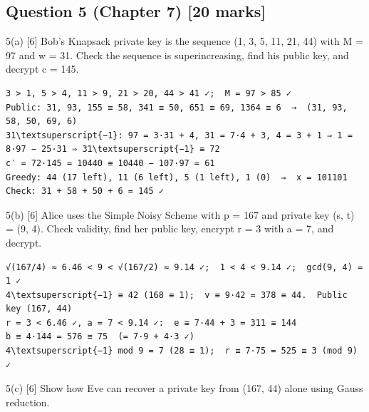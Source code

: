 \documentclass[11pt,a4paper]{article}
\begin{document}
\subsection*{Question 5 (Chapter 7) [20 marks]}
\begin{question}{5(a) \hfill\textnormal{\small [6]}}
Bob's Knapsack private key is the sequence (1, 3, 5, 11, 21, 44) with M = 97 and w = 31. Check the sequence is superincreasing, find his public key, and decrypt c = 145.\par
\end{question}
\begin{answer}
\begin{workbox}
\begin{Verbatim}[commandchars=\\\{\},fontsize=\footnotesize]
3 > 1, 5 > 4, 11 > 9, 21 > 20, 44 > 41 ✓;  M = 97 > 85 ✓
Public: 31, 93, 155 ≡ 58, 341 ≡ 50, 651 ≡ 69, 1364 ≡ 6  →  (31, 93, 58, 50, 69, 6)
31\textsuperscript{−1}: 97 = 3·31 + 4, 31 = 7·4 + 3, 4 = 3 + 1 ⇒ 1 = 8·97 − 25·31 ⇒ 31\textsuperscript{−1} ≡ 72
c′ = 72·145 = 10440 ≡ 10440 − 107·97 = 61
Greedy: 44 (17 left), 11 (6 left), 5 (1 left), 1 (0)  ⇒  x = 101101
Check: 31 + 58 + 50 + 6 = 145 ✓
\end{Verbatim}
\end{workbox}
\end{answer}
\begin{question}{5(b) \hfill\textnormal{\small [6]}}
Alice uses the Simple Noisy Scheme with p = 167 and private key (s, t) = (9, 4). Check validity, find her public key, encrypt r = 3 with a = 7, and decrypt.\par
\end{question}
\begin{answer}
\begin{workbox}
\begin{Verbatim}[commandchars=\\\{\},fontsize=\footnotesize]
√(167/4) ≈ 6.46 < 9 < √(167/2) ≈ 9.14 ✓;  1 < 4 < 9.14 ✓;  gcd(9, 4) = 1 ✓
4\textsuperscript{−1} ≡ 42 (168 ≡ 1);  v ≡ 9·42 = 378 ≡ 44.  Public key (167, 44)
r = 3 < 6.46 ✓, a = 7 < 9.14 ✓:  e ≡ 7·44 + 3 = 311 ≡ 144
b ≡ 4·144 = 576 ≡ 75  (= 7·9 + 4·3 ✓)
4\textsuperscript{−1} mod 9 = 7 (28 ≡ 1);  r ≡ 7·75 = 525 ≡ 3 (mod 9) ✓
\end{Verbatim}
\end{workbox}
\end{answer}
\begin{question}{5(c) \hfill\textnormal{\small [6]}}
Show how Eve can recover a private key from (167, 44) alone using Gauss reduction.\par
\end{question}
\end{document}
